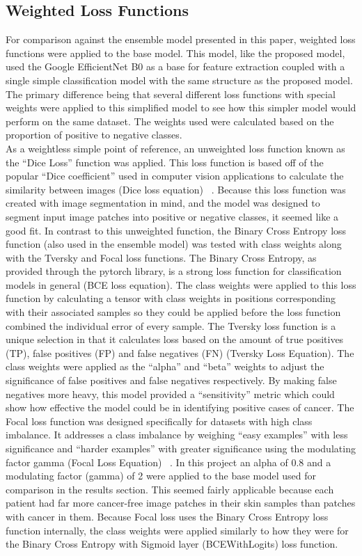 \documentclass[conference]{IEEEtran}
\begin{document}
\subsection{Weighted Loss Functions}
For comparison against the ensemble model presented in this paper, weighted
loss functions were applied to the base model.  This model, like the proposed
model, used the Google EfficientNet B0 as a base for feature extraction coupled
with a single simple classification model with the same structure as the
proposed model.  The primary difference being that several different loss
functions with special weights were applied to this simplified model to see how
this simpler model would perform on the same dataset.  The weights used were
calculated based on the proportion of positive to negative classes.
\\ \indent As a weightless simple point of reference, an unweighted loss
function known as the “Dice Loss” function was applied.  This loss function is
based off of the popular “Dice coefficient” used in computer vision
applications to calculate the similarity between images (Dice loss equation)
~\cite{loss_function_survey}.  Because this loss function was created with
image segmentation in mind, and the model was designed to segment input image
patches into positive or negative classes, it seemed like a good fit.  In
contrast to this unweighted function, the Binary Cross Entropy loss function
(also used in the ensemble model) was tested with class weights along with the
Tversky and Focal loss functions.  The Binary Cross Entropy, as provided
through the pytorch library, is a strong loss function for classification
models in general (BCE loss equation).  The class weights were applied to this
loss function by calculating a tensor with class weights in positions
corresponding with their associated samples so they could be applied before the
loss function combined the individual error of every sample.  The Tversky loss
function is a unique selection in that it calculates loss based on the amount
of true positives (TP), false positives (FP) and false negatives (FN) (Tversky
Loss Equation).  The class weights were applied as the “alpha” and “beta”
weights to adjust the significance of false positives and false negatives
respectively.  By making false negatives more heavy, this model provided a
“sensitivity” metric which could show how effective the model could be in
identifying positive cases of cancer.  The Focal loss function was designed
specifically for datasets with high class imbalance.  It addresses a class
imbalance by weighing “easy examples” with less significance and “harder
examples” with greater significance using the modulating factor gamma (Focal
Loss Equation) ~\cite{loss_function_survey}.  In this project an alpha of 0.8
and a modulating factor (gamma) of 2 were applied to the base model used for
comparison in the results section.  This seemed fairly applicable because each
patient had far more cancer-free image patches in their skin samples than
patches with cancer in them.  Because Focal loss uses the Binary Cross Entropy
loss function internally, the class weights were applied similarly to how they
were for the Binary Cross Entropy with Sigmoid layer (BCEWithLogits) loss
function.
\end{document}

